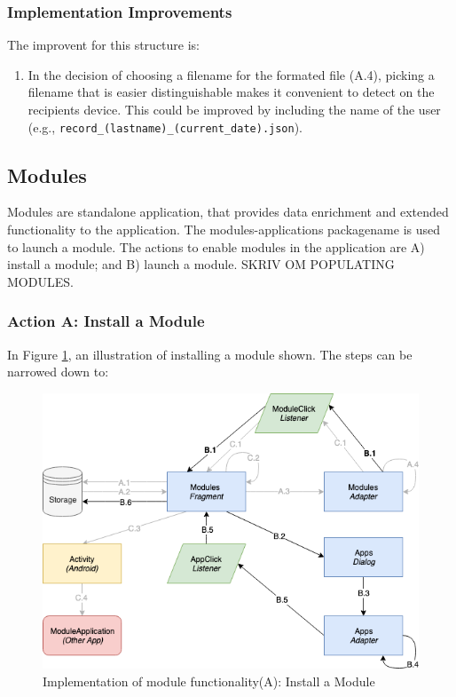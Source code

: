\subsubsection{Implementation Improvements}
The improvent for this structure is:
\begin{enumerate}
    \item In the decision of choosing a filename for the formated file (A.4), picking a filename that is easier distinguishable makes it convenient to detect on the recipients device. This could be improved by including the name of the user (e.g., \verb|record_(lastname)_(current_date).json|).
\end{enumerate}

\subsection{Modules}
Modules are standalone application, that provides data enrichment and extended functionality to the application. The modules-applications packagename is used to launch a module. The actions to enable modules in the application are A) install a module; and B) launch a module. SKRIV OM POPULATING MODULES. 

\subsubsection{Action A: Install a Module}
In Figure \ref{fig:impl_modulesB}, an illustration of installing a module shown. The steps can be narrowed down to:

\begin{figure}
    \centering
    \includegraphics[scale=0.6]{images/Module_ImpB.png}
    \caption{Implementation of module functionality(A): Install a Module}
    \label{fig:impl_modulesB}
\end{figure}

